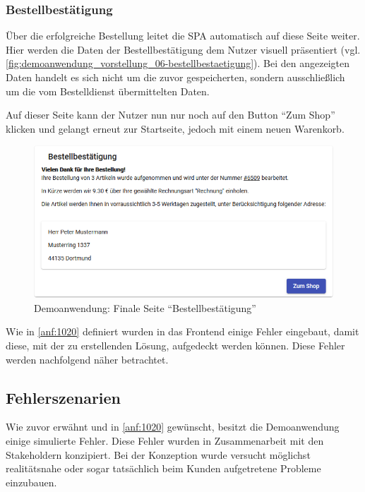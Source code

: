 \subsubsection{Bestellbestätigung}

Über die erfolgreiche Bestellung leitet die SPA automatisch auf diese Seite weiter. Hier werden die Daten der Bestellbestätigung dem Nutzer visuell präsentiert (vgl. \autoref{fig:demoanwendung_vorstellung_06-bestellbestaetigung}). Bei den angezeigten Daten handelt es sich nicht um die zuvor gespeicherten, sondern ausschließlich um die vom Bestelldienst übermittelten Daten.

Auf dieser Seite kann der Nutzer nun nur noch auf den Button \enquote{Zum Shop} klicken und gelangt erneut zur Startseite, jedoch mit einem neuen Warenkorb.

\begin{figure}[H]
	\centering
	\includegraphics[width=0.75\linewidth]{img/04_erstellung-poc/demoanwendung_vorstellung_06-bestellbestaetigung.png}
	\caption{Demoanwendung: Finale Seite \enquote{Bestellbestätigung}}
	\label{fig:demoanwendung_vorstellung_06-bestellbestaetigung}
\end{figure}

Wie in \autoref{anf:1020} definiert wurden in das Frontend einige Fehler eingebaut, damit diese, mit der zu erstellenden Lösung, aufgedeckt werden können. Diese Fehler werden nachfolgend näher betrachtet.

\subsection{Fehlerszenarien}
\label{subsec:fehlerszenarien}

Wie zuvor erwähnt und in \autoref{anf:1020} gewünscht, besitzt die Demoanwendung einige simulierte Fehler. Diese Fehler wurden in Zusammenarbeit mit den Stakeholdern konzipiert. Bei der Konzeption wurde versucht möglichst realitätsnahe oder sogar tatsächlich beim Kunden aufgetretene Probleme einzubauen.

